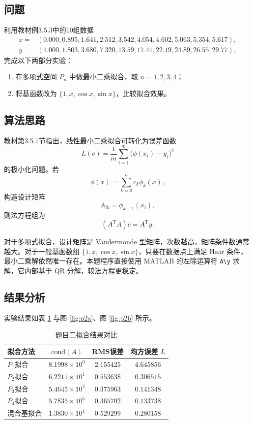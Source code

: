 \documentclass[UTF8,a4paper,11pt]{article}
\begin{document}
\subsection{问题}

利用教材例3.5.3中的10组数据
\[
\begin{aligned}
x=&(0.000,0.895,1.641,2.512,3.542,4.054,4.602,5.063,5.354,5.617),\\
y=&(1.000,1.803,3.680,7.320,13.59,17.41,22.19,24.89,26.55,29.77),
\end{aligned}
\]
完成以下两部分实验：
\begin{enumerate}
  \item 在多项式空间 $P_n$ 中做最小二乘拟合，取 $n=1,2,3,4$；
  \item 将基函数改为 $\{1,x,\cos x,\sin x\}$，比较拟合效果。
\end{enumerate}

\subsection{算法思路}

教材第3.5.1节指出，线性最小二乘拟合可转化为误差函数
\[
L(c)=\frac{1}{m}\sum_{i=1}^{m}\bigl(\phi(x_i)-y_i\bigr)^2
\]
的极小化问题。若
\[
\phi(x)=\sum_{k=0}^{n} c_k\phi_k(x),
\]
构造设计矩阵
\[
A_{ik}=\phi_{k-1}(x_i),
\]
则法方程组为
\[
(A^\mathrm{T}A)c=A^\mathrm{T}y.
\]

对于多项式拟合，设计矩阵是 Vandermonde 型矩阵，次数越高，矩阵条件数通常越大。对于一般基函数组 $\{1,x,\cos x,\sin x\}$，只要在数据点上满足 Haar 条件，最小二乘解依然唯一存在。本题程序直接使用 MATLAB 的左除运算符 \texttt{A\textbackslash y} 求解，它内部基于 QR 分解，较法方程更稳定。

\subsection{结果分析}

实验结果如表 \ref{tab:p2} 与图 \ref{fig:p2a}、图 \ref{fig:p2b} 所示。

\begin{table}[H]
\centering
\caption{题目二拟合结果对比}
\label{tab:p2}
\begin{tabular}{lccc}
\toprule
拟合方法 & $\mathrm{cond}(A)$ & RMS误差 & 均方误差 $L$ \\
\midrule
$P_1$拟合 & $8.1998\times10^0$ & $2.155425$ & $4.645856$ \\
$P_2$拟合 & $6.2211\times10^1$ & $0.553638$ & $0.306515$ \\
$P_3$拟合 & $5.4645\times10^2$ & $0.375963$ & $0.141348$ \\
$P_4$拟合 & $5.7835\times10^3$ & $0.365702$ & $0.133738$ \\
混合基拟合 & $1.3830\times10^1$ & $0.529299$ & $0.280158$ \\
\bottomrule
\end{tabular}
\end{table}
\end{document}
